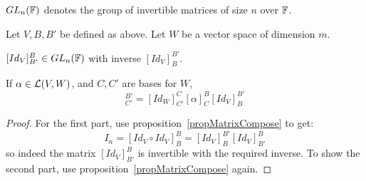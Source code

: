 \documentclass[../Main.tex]{subfiles}
\begin{document}
$GL_n(\mathbb{F})$ denotes the group of invertible matrices of size $n$ over $\mathbb{F}$.
\begin{propositions}{
        Let $V, B, B'$ be defined as above. Let $W$ be a vector space of dimension $m$.
        \label{propsChangeOfBasis}
    }
    \item $[Id_V]_{B'}^B \in GL_n(\mathbb{F})$ with inverse $[Id_V]_B^{B'}$. \label{propCOBInverse}
    \item If $\alpha \in \mathcal{L}(V, W)$, and $C, C'$ are bases for $W$,
        \begin{equation*}
            [\alpha]_{C'}^{B'} = [Id_W]_{C'}^C [\alpha]_C^B [Id_V]_B^{B'}
        \end{equation*}
\end{propositions}
\begin{proof}
    For the first part, use proposition~\ref{propMatrixCompose} to get:
    \begin{equation*}
        I_n = [Id_V \circ Id_V]_B^B = [Id_V]_B^{B'} [Id_V]_{B'}^B
    \end{equation*}
    so indeed the matrix $[Id_V]_{B'}^B$ is invertible with the required inverse. To show the second part, use proposition~\ref{propMatrixCompose} again.
\end{proof}
\end{document}
